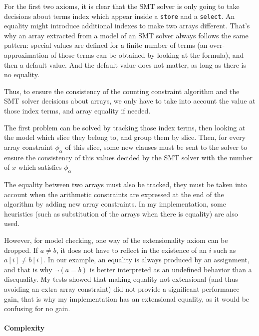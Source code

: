 For the first two axioms, it is clear that the SMT solver is only going
to take decisions about terms index which appear inside a \texttt{store}
and a \texttt{select}. An equality might introduce additional indexes to
make two arrays different. That's why an array extracted from a model of
an SMT solver always follows the same pattern: special values are
defined for a finite number of terms (an over-approximation of those
terms can be obtained by looking at the formula), and then a default
value. And the default value does not matter, as long as there is no
equality.

\begin{example}
\end{example}


Thus, to ensure the consistency of the counting constraint algorithm and
the SMT solver decisions about arrays, we only have to take into account
the value at those index terms, and array equality if needed.

The first problem can be solved by tracking those index terms, then
looking at the model which slice they belong to, and group them by
slice. Then, for every array constraint $\phi_\alpha$ of this slice,
some new clauses must be sent to the solver to ensure the consistency of
this values decided by the SMT solver with the number of $x$ which
satisfies $\phi_\alpha$

The equality between two arrays must also be tracked, they must be taken
into account when the arithmetic constraints are expressed at the end of
the algorithm by adding new array constraints. In my implementation, some heuristics (such as
substitution of the arrays when there is equality) are also used.

However, for model checking, one way of the extensionality axiom can be dropped. If $a \neq b$, it
does not have to reflect in the existence of an $i$ such as $a[i] \neq b[i]$. In our example, an
equality is always produced by an assignment, and that is why $\lnot (a = b)$ is better interpreted
as an undefined behavior than a disequality. My tests showed that making equality not extensional
(and thus avoiding an extra array constraint) did not provide a significant performance gain, that
is why my implementation has an extensional equality, as it would be confusing for no gain.


\paragraph{Complexity}

